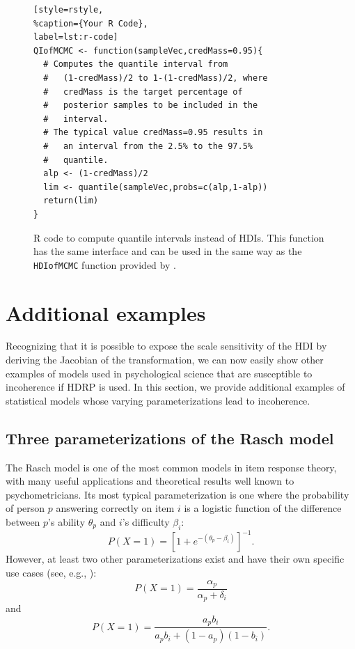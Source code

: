 \documentclass[9pt,twocolumn,twoside]{cidlab-draft}\templatetype{cidlab-invited}
\newcommand{\hdr}{HDRP}
\begin{document}
\begin{figure}
    \centering
\begin{lstlisting}[style=rstyle, 
%caption={Your R Code}, 
label=lst:r-code]
QIofMCMC <- function(sampleVec,credMass=0.95){
  # Computes the quantile interval from
  #   (1-credMass)/2 to 1-(1-credMass)/2, where
  #   credMass is the target percentage of 
  #   posterior samples to be included in the
  #   interval.
  # The typical value credMass=0.95 results in
  #   an interval from the 2.5% to the 97.5%
  #   quantile.
  alp <- (1-credMass)/2
  lim <- quantile(sampleVec,probs=c(alp,1-alp))
  return(lim)
}\end{lstlisting}
\caption{R code to compute quantile intervals instead of HDIs.  This function has the same interface and can be used in the same way as the \texttt{HDIofMCMC} function provided by \protect{}.}
    \label{fig:rcode}
\end{figure}

\section*{Additional examples}

Recognizing that it is possible to expose the scale sensitivity of the HDI by deriving the Jacobian of the transformation, we can now easily show other examples of models used in psychological science that are susceptible to incoherence if \hdr{} is used.  In this section, we provide  additional examples of statistical models whose varying parameterizations lead to incoherence.

\subsection*{Three parameterizations of the Rasch model}

The Rasch model \cite{Rasch1960} is one of the most common models in item response theory, with many useful applications and theoretical results well known to psychometricians.  Its most typical parameterization is one where the probability of person $p$ answering correctly on item $i$ is a logistic function of the difference between $p$'s ability $\theta_p$ and $i$'s difficulty $\beta_i$: $$P(X = 1) = \left[1+e^{-(\theta_p-\beta_i)}\right]^{-1}.$$ However, at least two other parameterizations exist and have their own specific use cases (see, e.g., ): $$P(X = 1) = \frac{\alpha_p}{\alpha_p + \delta_i}$$ and $$P(X = 1) = \frac{a_p b_i}{a_pb_i+(1-a_p)(1-b_i)}.$$
\end{document}
